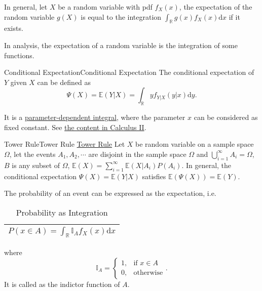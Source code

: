 \documentclass[titlestyle=hang,11pt]{elegantbook}
\begin{document}
In general, let $X$ be a random variable with pdf $f_X(x)$, the expectation of the random variable $g(X)$ is equal to the integration $\int_{\mathbb{R}}g(x)f_X(x)\mathrm{d}x$ if it exists.

In analysis, the expectation of a random variable is the integration of some functions.

\begin{definition}{Conditional Expectation}{Conditional Expectation}
The conditional expectation of $Y$ given $X$ can be defined as
$$\Psi(X) =\mathbb{E}(Y|X)=\int_{\mathbb{R}} y f_{Y|X}(y|x) \mathrm{d}y.$$
\end{definition}

It is a \href{https://www.encyclopediaofmath.org/index.php/Parameter-dependent_integral}{parameter-dependent integral}, where the parameter $x$ can be considered as fixed constant. See \href{http://ocw.uc3m.es/matematicas/calculus-ii/C2/unit3.pdf}{the content in Calculus II}.

\begin{definition}{Tower Rule}{Tower Rule}
\href{https://www.wikiwand.com/en/Law_of_total_expectation}{Tower Rule}
Let $X$ be random variable on a sample space $\Omega$, let the events $A_1, A_2, \cdots$ are disjoint in the sample space $\Omega$ and $\bigcup_{i=1}^{\infty}A_i = \Omega$, $B$ is any subset of $\Omega$, $\mathbb{E}(X)=\sum_{i=1}^{\infty}\mathbb{E}(X|A_i)P(A_i)$. In general, the conditional expectation $\Psi(X)=\mathbb{E}(Y|X)$ satisfies $\mathbb{E}(\Psi(X))=\mathbb{E}(Y).$
\end{definition}

The probability of an event can be expressed as the expectation, i.e.

\begin{table}[h]
	\centering
	\caption{Probability as Integration}
	\begin{tabular}{|c|}
		\hline
		$P(x\in A)= \int_{\mathbb{R}}\mathbb{I}_{A}f_X(x)\mathrm{d}x$ \\
		\hline
	\end{tabular}
\end{table}
where
\begin{equation}
\mathbb{I}_{A}=
\begin{cases}
	1, & \text{if $x\in A$} \\
	0, & \text{otherwise}
\end{cases}.
\end{equation}
It is called as the indictor function of $A$.
\end{document}
